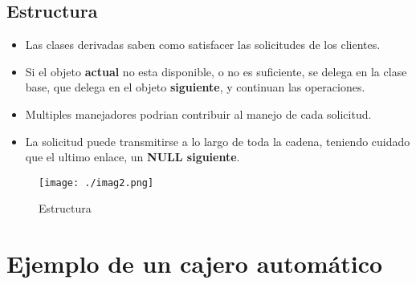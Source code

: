 \documentclass[a4paper,10pt]{article}
\begin{document}
\subsection{Estructura}
\begin{itemize}
 \item Las clases derivadas saben como satisfacer las solicitudes de los clientes.
 \item Si el objeto \textbf{actual} no esta disponible, o no es suficiente, se delega en la clase base, que delega en el objeto \textbf{siguiente}, y continuan las operaciones.
 \item Multiples manejadores podrian contribuir al manejo de cada solicitud.
 \item La solicitud puede transmitirse a lo largo de toda la cadena, teniendo cuidado que el ultimo enlace, un \textbf{NULL siguiente}. 
\end{itemize}

\begin{figure}[h!]
 \centering
 \texttt{[image: ./imag2.png]}
 \caption{Estructura}
 \label{fig:2}
\end{figure}


\section{Ejemplo de un cajero autom\'atico}
\end{document}
